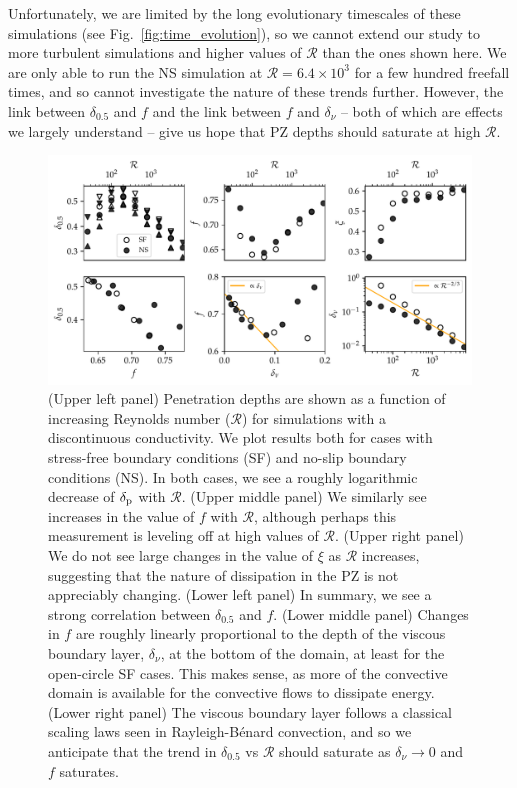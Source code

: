 \documentclass{aastex631}
\newcommand{\delp}{\ensuremath{\delta_{\rm{p}}}}
\newcommand{\mR}{\ensuremath{\mathcal{R}}}
\begin{document}
Unfortunately, we are limited by the long evolutionary timescales of these simulations (see Fig.~\ref{fig:time_evolution}), so we cannot extend our study to more turbulent simulations and higher values of $\mR$ than the ones shown here.
We are only able to run the NS simulation at $\mR = 6.4 \times 10^3$ for a few hundred freefall times, and so cannot investigate the nature of these trends further.
However, the link between $\delta_{0.5}$ and $f$ and the link between $f$ and $\delta_\nu$ -- both of which are effects we largely understand -- give us hope that PZ depths should saturate at high $\mR$.


\begin{figure}[t!]
\centering
\includegraphics{parameters_vs_re.pdf}
\caption{
(Upper left panel) Penetration depths are shown as a function of increasing Reynolds number ($\mR$) for simulations with a discontinuous conductivity.
We plot results both for cases with stress-free boundary conditions (SF) and no-slip boundary conditions (NS).
In both cases, we see a roughly logarithmic decrease of $\delp$ with $\mR$.
(Upper middle panel) We similarly see increases in the value of $f$ with $\mR$, although perhaps this measurement is leveling off at high values of $\mR$.
(Upper right panel) We do not see large changes in the value of $\xi$ as $\mR$ increases, suggesting that the nature of dissipation in the PZ is not appreciably changing.
(Lower left panel) In summary, we see a strong correlation between $\delta_{0.5}$ and $f$.
(Lower middle panel) Changes in $f$ are roughly linearly proportional to the depth of the viscous boundary layer, $\delta_\nu$, at the bottom of the domain, at least for the open-circle SF cases.
This makes sense, as more of the convective domain is available for the convective flows to dissipate energy.
(Lower right panel) The viscous boundary layer follows a classical scaling laws seen in Rayleigh-B\'{e}nard convection, and so we anticipate that the trend in $\delta_{0.5}$ vs $\mR$ should saturate as $\delta_{\nu} \rightarrow 0$ and $f$ saturates.
\label{fig:parameters_vs_re}
}
\end{figure}
\end{document}
